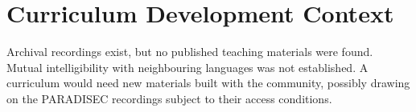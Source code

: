 \documentclass[12pt]{article}
\begin{document}
\section{Curriculum Development Context}
Archival recordings exist, but no published teaching materials were found. Mutual intelligibility with neighbouring languages was not established. A curriculum would need new materials built with the community, possibly drawing on the PARADISEC recordings subject to their access conditions.
\end{document}
